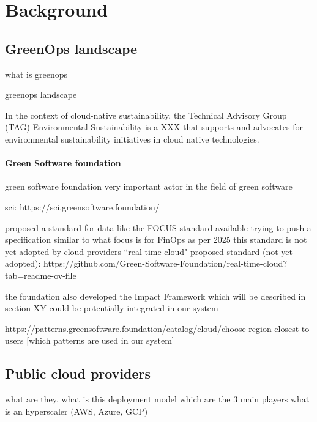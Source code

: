 \chapter{Background}
\label{cha:background}

\section{GreenOps landscape}

what is greenops

greenops landscape 

In the context of cloud-native sustainability,
the Technical Advisory Group (TAG) Environmental Sustainability is a XXX that supports and advocates for environmental sustainability initiatives in cloud native technologies.



\subsubsection{Green Software foundation}

green software foundation
very important actor in the field of green software

sci: https://sci.greensoftware.foundation/

proposed a standard for data like the FOCUS standard available 
trying to push a specification similar to what focus is for FinOps
as per 2025 this standard is not yet adopted by cloud providers
``real time cloud" proposed standard (not yet adopted): https://github.com/Green-Software-Foundation/real-time-cloud?tab=readme-ov-file

the foundation also developed the Impact Framework which will be described in section XY
could be potentially integrated in our system

https://patterns.greensoftware.foundation/catalog/cloud/choose-region-closest-to-users
[which patterns are used in our system]

\section{Public cloud providers}

what are they, what is this deployment model
which are the 3 main players
what is an hyperscaler (AWS, Azure, GCP)

